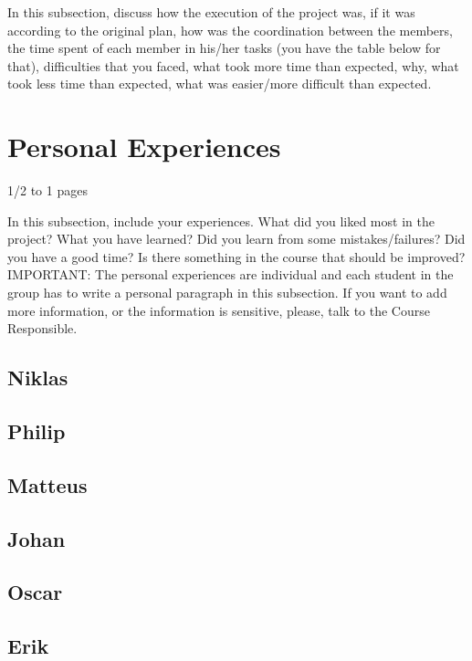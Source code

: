 In this subsection, discuss how the execution of the project was, if it was according to the original plan, how was the coordination between the members, the time spent of each member in his/her tasks (you have the table below for that), difficulties that you faced, what took more time than expected, why, what took less time than expected, what was easier/more difficult than expected. 


\section{Personal Experiences}\label{cha:personalexp}
1/2 to 1 pages

In this subsection, include your experiences. What did you liked most in the project? What you have learned? Did you learn from some mistakes/failures? Did you have a good time? Is there something in the course that should be improved? IMPORTANT: The personal experiences are individual and each student in the group has to write a personal paragraph in this subsection. If you want to add more information, or the information is sensitive, please, talk to the Course Responsible.

\subsection{Niklas}

\subsection{Philip}

\subsection{Matteus}

\subsection{Johan}

\subsection{Oscar}

\subsection{Erik}



